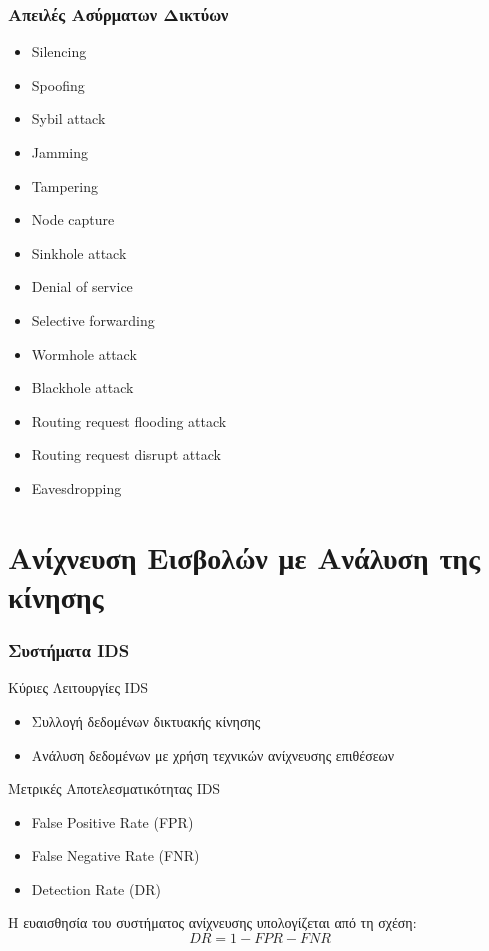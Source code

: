 \documentclass[handouts,hyperref={pdfpagelabels=false}]{beamer}
\begin{document}
\begin{frame}
\frametitle{\foreignlanguage{greek}{Απειλές Ασύρματων Δικτύων}}
\begin{itemize}
    \item \textlatin{Silencing}
    \item \textlatin{Spoofing}
    \item \textlatin{Sybil attack}
    \item \textlatin{Jamming}
    \item \textlatin{Tampering}
    \item \textlatin{Node capture}
    \item \textlatin{Sinkhole attack}
    \item \textlatin{Denial of service}
    \item \textlatin{Selective forwarding}
    \item \textlatin{Wormhole attack}
    \item \textlatin{Blackhole attack}
    \item \textlatin{Routing request flooding attack}
    \item \textlatin{Routing request disrupt attack}
    \item \textlatin{Eavesdropping}
\end{itemize}
\end{frame}

\section{\foreignlanguage{greek}{Ανίχνευση Εισβολών με Ανάλυση της κίνησης}}
\begin{frame}
\frametitle{\foreignlanguage{greek}{Συστήματα \textlatin{IDS}}}
\begin{block}{Κύριες Λειτουργίες \textlatin{IDS}}
\begin{itemize}
    \item Συλλογή δεδομένων δικτυακής κίνησης
    \item Ανάλυση δεδομένων με χρήση τεχνικών ανίχνευσης επιθέσεων
\end{itemize}
\end{block}

\begin{block}{Μετρικές Αποτελεσματικότητας \textlatin{IDS}}
\begin{itemize}
    \item \textlatin{False Positive Rate (FPR)}
    \item \textlatin{False Negative Rate (FNR)}
    \item \textlatin{Detection Rate (DR)}
\end{itemize}
Η ευαισθησία του συστήματος ανίχνευσης υπολογίζεται από τη σχέση:
\[DR = 1 - FPR - FNR\]
\end{block}
\end{frame}
\end{document}

